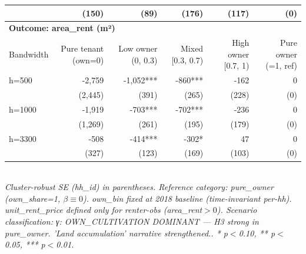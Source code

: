 \begin{table}[t]
\begin{tabular}{lrrrrr}
    & (150) & (89) & (176) & (117) & (0) \\
\midrule
\multicolumn{6}{l}{\textbf{Outcome: area\_rent (m²)}} \\
Bandwidth & Pure tenant (own=0) & Low owner (0, 0.3) & Mixed [0.3, 0.7) & High owner [0.7, 1) & Pure owner (=1, ref) \\
\midrule
h=500 & -2,759 & -1,052*** & -860*** & -162 & 0 \\
    & (2,445) & (391) & (265) & (228) & (0) \\
h=1000 & -1,919 & -703*** & -702*** & -236 & 0 \\
    & (1,269) & (261) & (195) & (179) & (0) \\
h=3300 & -508 & -414*** & -302* & 47 & 0 \\
    & (327) & (123) & (169) & (103) & (0) \\
\midrule
\bottomrule
\end{tabular}
\\
\footnotesize\textit{Cluster-robust SE (hh\_id) in parentheses. Reference category: pure\_owner (own\_share=1, $\beta \equiv 0$). own\_bin fixed at 2018 baseline (time-invariant per-hh). unit\_rent\_price defined only for renter-obs (area\_rent$>0$). Scenario classification: γ: OWN_CULTIVATION DOMINANT — H3 strong in pure_owner. 'Land accumulation' narrative strengthened.. * p$<$0.10, ** p$<$0.05, *** p$<$0.01.}
\end{table}

